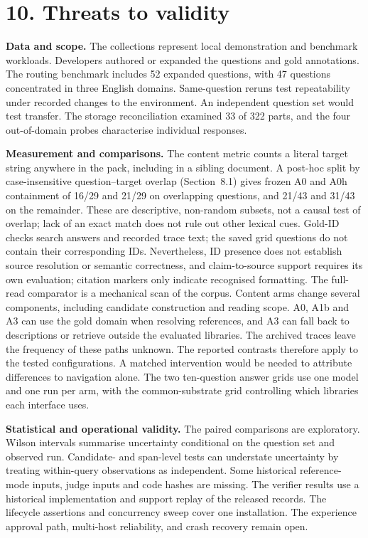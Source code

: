 \section{10. Threats to validity}


\noindent\textbf{Data and scope.} The collections represent local
demonstration and benchmark workloads. Developers authored or expanded the
questions and gold annotations. The routing benchmark includes 52 expanded
questions, with 47 questions concentrated in three English domains.
Same-question reruns test repeatability under recorded changes to the
environment. An independent question set would test transfer. The storage
reconciliation examined 33 of 322 parts, and the four out-of-domain probes
characterise individual responses.

\noindent\textbf{Measurement and comparisons.} The content metric counts a
literal target string anywhere in the pack, including in a sibling
document. A post-hoc split by case-insensitive question--target overlap
(Section~8.1) gives frozen A0 and A0h containment of
16/29 and 21/29 on overlapping questions, and 21/43 and 31/43 on the
remainder. These are descriptive, non-random subsets, not a causal test of
overlap; lack of an exact match does not rule out other lexical cues.
Gold-ID checks search answers and recorded trace text; the saved grid
questions do not contain their corresponding IDs. Nevertheless, ID presence
does not establish source resolution or semantic correctness, and
claim-to-source support requires its own evaluation; citation markers only
indicate recognised formatting. The full-read comparator is a mechanical
scan of the corpus. Content arms change several components, including candidate
construction and reading scope. A0, A1b and A3 can use the gold domain when
resolving references, and A3 can fall back to descriptions or retrieve
outside the evaluated libraries. The archived traces leave the frequency of
these paths unknown. The reported contrasts therefore apply to the tested
configurations. A matched intervention would be needed to attribute
differences to navigation alone. The two ten-question answer grids use one
model and one run per arm, with the common-substrate grid controlling which
libraries each interface uses.

\noindent\textbf{Statistical and operational validity.} The paired
comparisons are exploratory. Wilson intervals summarise uncertainty
conditional on the question set and observed run. Candidate- and span-level
tests can understate uncertainty by treating within-query observations as
independent. Some historical reference-mode inputs, judge inputs and code
hashes are missing. The verifier results use a historical implementation
and support replay of the released records. The lifecycle assertions and
concurrency sweep cover one installation. The experience approval path,
multi-host reliability, and crash recovery remain open.


